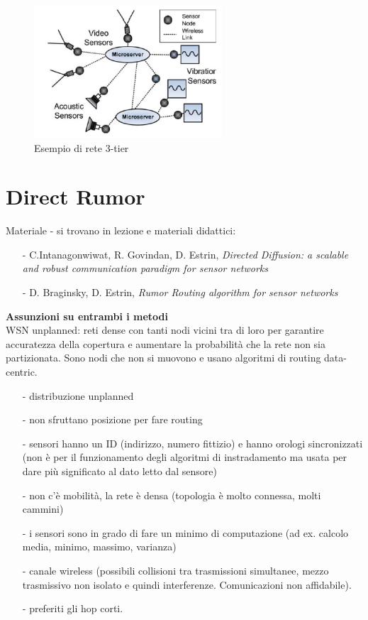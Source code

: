 \documentclass[12pt,italian]{report}
\begin{document}
\begin{figure}[h]
	\centering
    \includegraphics[width=70mm]{img/3tier.PNG}
    \caption{Esempio di rete 3-tier}
    \label{fig:3t}
\end{figure}

\chapter{Direct Rumor}
\label{cap:dr}
Materiale - si trovano in lezione e materiali didattici: 
\begin{itemize}
    \item[-] C.Intanagonwiwat, R. Govindan, D. Estrin, \textit{Directed
            Diffusion: a scalable and robust communication paradigm
            for sensor networks}
    \item[-] D. Braginsky, D. Estrin, \textit{Rumor Routing algorithm for
            sensor networks}
\end{itemize}
\noindent \textbf{Assunzioni su entrambi i metodi} \\ WSN unplanned: reti dense con tanti nodi vicini tra di loro per garantire accuratezza della copertura e aumentare la probabilità che la rete non sia partizionata. Sono nodi che non si muovono e usano algoritmi di routing data-centric. 
 \begin{itemize}
     \item[-] distribuzione unplanned
     \item[-] non sfruttano posizione per fare routing
     \item[-] sensori hanno un ID (indirizzo, numero fittizio) e hanno orologi sincronizzati (non è per il funzionamento degli algoritmi di instradamento ma usata per dare più significato al dato letto dal sensore)
     \item[-] non c'è mobilità, la rete è densa (topologia è molto connessa, molti cammini)
     \item[-] i sensori sono in grado di fare un minimo di computazione (ad ex. calcolo media, minimo, massimo, varianza)
     \item[-] canale wireless (possibili collisioni tra trasmissioni simultanee, mezzo trasmissivo non isolato e quindi interferenze. Comunicazioni non affidabile).
     \item[-] preferiti gli hop corti.
 \end{itemize}
\end{document}
